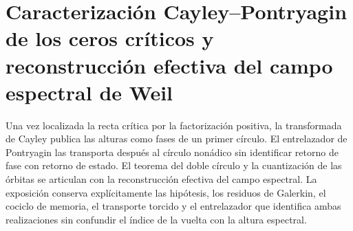 \chapter{Caracterización Cayley–Pontryagin de los ceros críticos y reconstrucción efectiva del campo espectral de Weil}
\label{chap:hmt83-doble-circulo-campo-espectral}

Una vez localizada la recta crítica por la factorización positiva, la
transformada de Cayley publica las alturas como fases de un primer círculo. El
entrelazador de Pontryagin las transporta después al círculo nonádico sin
identificar retorno de fase con retorno de estado. El teorema del doble círculo
y la cuantización de las órbitas se articulan con la reconstrucción efectiva
del campo espectral. La exposición conserva explícitamente las hipótesis, los
residuos de Galerkin, el cociclo de memoria, el transporte torcido y el
entrelazador que identifica ambas realizaciones sin confundir el índice de la
vuelta con la altura espectral.


